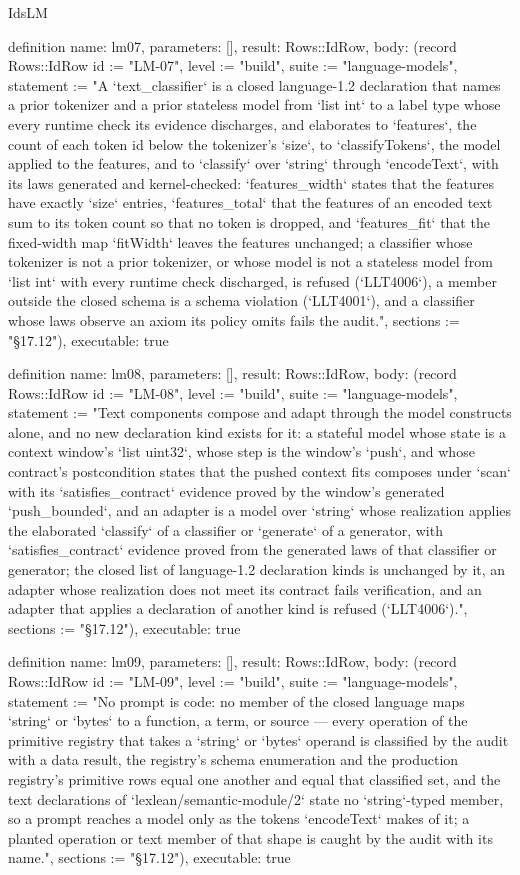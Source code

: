 \begin{lexlean}{IdsLM}
\begin{semanticmodule}
definition{
  name: lm07,
  parameters: [],
  result: Rows::IdRow,
  body: (record Rows::IdRow {id := "LM-07", level := "build", suite := "language-models", statement := "A `text_classifier` is a closed language-1.2 declaration that names a prior tokenizer and a prior stateless model from `list int` to a label type whose every runtime check its evidence discharges, and elaborates to `features`, the count of each token id below the tokenizer's `size`, to `classifyTokens`, the model applied to the features, and to `classify` over `string` through `encodeText`, with its laws generated and kernel-checked: `features_width` states that the features have exactly `size` entries, `features_total` that the features of an encoded text sum to its token count so that no token is dropped, and `features_fit` that the fixed-width map `fitWidth` leaves the features unchanged; a classifier whose tokenizer is not a prior tokenizer, or whose model is not a stateless model from `list int` with every runtime check discharged, is refused (`LLT4006`), a member outside the closed schema is a schema violation (`LLT4001`), and a classifier whose laws observe an axiom its policy omits fails the audit.", sections := "§17.12"}),
  executable: true
}

definition{
  name: lm08,
  parameters: [],
  result: Rows::IdRow,
  body: (record Rows::IdRow {id := "LM-08", level := "build", suite := "language-models", statement := "Text components compose and adapt through the model constructs alone, and no new declaration kind exists for it: a stateful model whose state is a context window's `list uint32`, whose step is the window's `push`, and whose contract's postcondition states that the pushed context fits composes under `scan` with its `satisfies_contract` evidence proved by the window's generated `push_bounded`, and an adapter is a model over `string` whose realization applies the elaborated `classify` of a classifier or `generate` of a generator, with `satisfies_contract` evidence proved from the generated laws of that classifier or generator; the closed list of language-1.2 declaration kinds is unchanged by it, an adapter whose realization does not meet its contract fails verification, and an adapter that applies a declaration of another kind is refused (`LLT4006`).", sections := "§17.12"}),
  executable: true
}

definition{
  name: lm09,
  parameters: [],
  result: Rows::IdRow,
  body: (record Rows::IdRow {id := "LM-09", level := "build", suite := "language-models", statement := "No prompt is code: no member of the closed language maps `string` or `bytes` to a function, a term, or source — every operation of the primitive registry that takes a `string` or `bytes` operand is classified by the audit with a data result, the registry's schema enumeration and the production registry's primitive rows equal one another and equal that classified set, and the text declarations of `lexlean/semantic-module/2` state no `string`-typed member, so a prompt reaches a model only as the tokens `encodeText` makes of it; a planted operation or text member of that shape is caught by the audit with its name.", sections := "§17.12"}),
  executable: true
}


\end{semanticmodule}
\end{lexlean}
